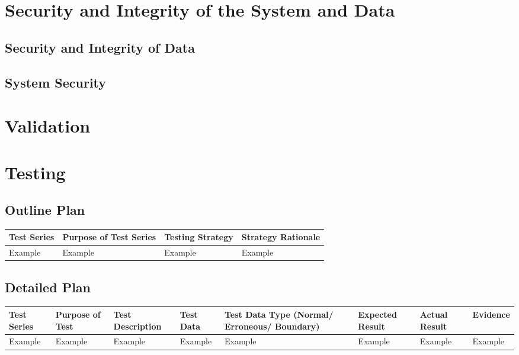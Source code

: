 \section{Security and Integrity of the System and Data}

\subsection{Security and Integrity of Data}

\subsection{System Security}

\section{Validation}

\section{Testing}

\begin{landscape}
\subsection{Outline Plan}

\begin{center}
    \begin{tabular}{|p{2cm}|p{5cm}|p{5cm}|p{4cm}|}
        \hline
        \textbf{Test Series} & \textbf{Purpose of Test Series} & \textbf{Testing Strategy} & \textbf{Strategy Rationale}\\ \hline
        Example & Example & Example & Example \\ \hline
    \end{tabular}
\end{center}

\subsection{Detailed Plan}

\begin{center}
    \begin{longtable}{|p{1.5cm}|p{2.5cm}|p{2.5cm}|p{2cm}|p{2cm}|p{2cm}|p{2cm}|p{2cm}|}
        \hline
        \textbf{Test Series} & \textbf{Purpose of Test} & \textbf{Test Description} & \textbf{Test Data} & \textbf{Test Data Type (Normal/ Erroneous/ Boundary)} & \textbf{Expected Result} & \textbf{Actual Result} & \textbf{Evidence}\\ \hline
        Example & Example & Example & Example & Example & Example & Example & Example \\ \hline
    \end{longtable}
\end{center}
\end{landscape}